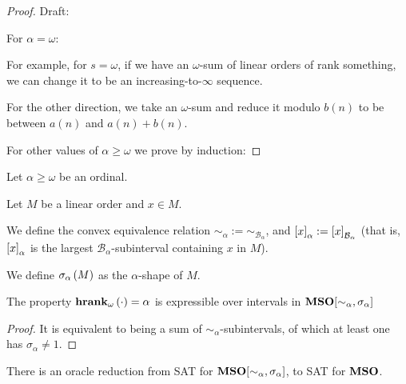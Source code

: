 \begin{proof}
  Draft:
  
  For $\alpha = \omega$:

  For example, for $s = \omega$, if we have an $\omega$-sum
  of linear orders of rank something, we can change it
  to be an increasing-to-$\infty$ sequence.

  For the other direction, we take an $\omega$-sum and reduce it modulo
  $b(n)$ to be between $a(n)$ and $a(n) + b(n)$.

  For other values of $\alpha \ge \omega$ we prove by induction:
\end{proof}

\begin{definition}
  Let $\alpha \ge \omega$ be an ordinal.

  Let $M$ be a linear order and $x \in M$.

  We define the convex equivalence relation $\sim_\alpha := \sim_{\mathcal{B}_{\alpha}}$,
  and $\left[ {x} \right]_{\alpha} := \left[ {x} \right]_{\mathcal{B}_{\alpha}}$ (that is,
  $\left[ {x} \right]_{\alpha}$ is the largest $\mathcal{B}_{\alpha}$-subinterval
  containing $x$ in $M$).

  We define $\sigma_{\alpha} \left( {M} \right)$ as 
  the $\alpha$-shape of $M$.
\end{definition}


\begin{lemma}
  The property
  $\mathbf{hrank}_{\omega}\left( \cdot \right) = \alpha$ is expressible over intervals
   in $\mathbf{MSO}[\sim_{\alpha}, \sigma_{\alpha}]$
\end{lemma}

\begin{proof}
  It is equivalent to being a sum of $\sim_{\alpha}$-subintervals,
  of which at least one has $\sigma_{\alpha} \ne 1$.
\end{proof}

\begin{theorem}
  There is an oracle reduction from SAT for $\mathbf{MSO}[\sim_{\alpha}, \sigma_{\alpha}]$,
  to SAT for $\mathbf{MSO}$.
\end{theorem}

